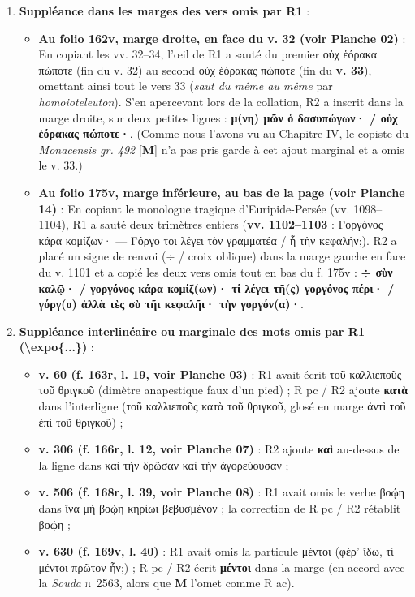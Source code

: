 \documentclass[11pt, a4paper, twoside]{article}
\renewcommand{\_}{\origunderscore\penalty0\relax}
\renewcommand{\texttt}[1]{#1}
\newcommand{\Run}{\textbf{R}\textsuperscript{1}}
\newcommand{\Rac}{\textbf{R}\textsuperscript{ac}}
\newcommand{\Rpc}{\textbf{R}\textsuperscript{pc}}
\newcommand{\Rdeux}{\textbf{R}\textsuperscript{2}}
\newcommand{\M}{\textbf{M}}
\newcommand{\expo}[1]{\textsuperscript{#1}}
\def\Run{R1}%
\def\Rac{R ac}%
\def\Rpc{R pc}%
\def\Rdeux{R2}%
\def\expo#1{#1}%
\begin{document}
\begin{enumerate}[leftmargin=1.6em, itemsep=2pt]
  \item \textbf{Suppléance dans les marges des vers omis par \Run{}} :
  \begin{itemize}[leftmargin=1.5em, itemsep=2pt]
    \item \textbf{Au folio \texttt{162v}, marge droite, en face du v. 32 (voir Planche 02)} : En copiant les vv. 32–34, l'œil de \Run{} a sauté du premier \texttt{οὐχ ἑόρακα πώποτε} (fin du v. 32) au second \texttt{οὐχ ἑόρακας πώποτε} (fin du \textbf{v. 33}), omettant ainsi tout le vers 33 (\textit{saut du même au même} par \textit{homoioteleuton}). S'en apercevant lors de la collation, \Rdeux{} a inscrit dans la marge droite, sur deux petites lignes : \textbf{\texttt{μ(νη) μῶν ὁ δασυπώγων· / οὐχ ἑόρακας πώποτε·}}. (Comme nous l'avons vu au Chapitre IV, le copiste du \textit{Monacensis gr. 492} [\M{}] n'a pas pris garde à cet ajout marginal et a omis le v. 33.)
    \item \textbf{Au folio \texttt{175v}, marge inférieure, au bas de la page (voir Planche 14)} : En copiant le monologue tragique d'Euripide-Persée (\texttt{vv. 1098–1104}), \Run{} a sauté deux trimètres entiers (\textbf{vv. 1102–1103} : \texttt{Γοργόνος κάρα κομίζων· — Γόργο τοι λέγει τὸν γραμματέα / ἦ τὴν κεφαλήν;}). \Rdeux{} a placé un signe de renvoi (\texttt{÷} / croix oblique) dans la marge gauche en face du v. 1101 et a copié les deux vers omis tout en bas du \texttt{f. 175v} : \textbf{\texttt{÷ σὺν καλῷ· / γοργόνος κάρα κομίζ(ων)· τί λέγει τῆ(ς) γοργόνος πέρι· / γόργ(ο) ἀλλὰ τὲς σὺ τῆι κεφαλῆι· τὴν γοργόν(α)·}}.
  \end{itemize}

  \item \textbf{Suppléance interlinéaire ou marginale des mots omis par \Run{} (\texttt{\textbackslash expo\{...\}})} :
  \begin{itemize}[leftmargin=1.5em, itemsep=2pt]
    \item \textbf{v. 60 (\texttt{f. 163r}, l. 19, voir Planche 03)} : \Run{} avait écrit \texttt{τοῦ καλλιεποῦς τοῦ θριγκοῦ} (dimètre anapestique faux d'un pied) ; \Rpc{} / \Rdeux{} ajoute \textbf{\texttt{κατὰ}} dans l'interligne (\texttt{τοῦ καλλιεποῦς \expo{κατὰ} τοῦ θριγκοῦ}, glosé en marge \texttt{ἀντὶ τοῦ ἐπὶ τοῦ θριγκοῦ}) ;
    \item \textbf{v. 306 (\texttt{f. 166r}, l. 12, voir Planche 07)} : \Rdeux{} ajoute \textbf{\texttt{καὶ}} au-dessus de la ligne dans \texttt{καὶ τὴν δρῶσαν \expo{καὶ} τὴν ἀγορεύουσαν} ;
    \item \textbf{v. 506 (\texttt{f. 168r}, l. 39, voir Planche 08)} : \Run{} avait omis le verbe \texttt{βοῴη} dans \texttt{ἵνα μὴ βοῴη κηρίωι βεβυσμένον} ; la correction de \Rpc{} / \Rdeux{} rétablit \texttt{\expo{βοῴη}} ;
    \item \textbf{v. 630 (\texttt{f. 169v}, l. 40)} : \Run{} avait omis la particule \texttt{μέντοι} (\texttt{φέρ' ἴδω, τί μέντοι πρῶτον ἦν;}) ; \Rpc{} / \Rdeux{} écrit \textbf{\texttt{μέντοι}} dans la marge (en accord avec la \textit{Souda} π~2563, alors que \M{} l'omet comme \Rac{}).
  \end{itemize}


\end{enumerate}
\end{document}
